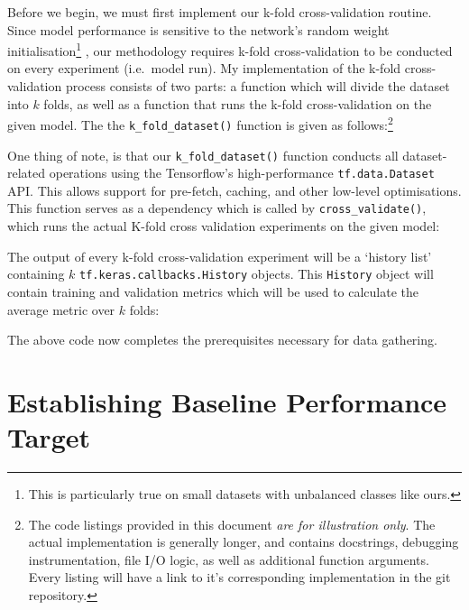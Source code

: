 Before we begin, we must first implement our k-fold cross-validation routine. Since model performance is sensitive to the network's random weight initialisation\footnote{This is particularly true on small datasets with unbalanced classes like ours.} \autocite{Narkhede2022}, our methodology requires k-fold cross-validation to be conducted on every experiment (i.e.\ model run). My implementation of the k-fold cross-validation process consists of two parts: a function which will divide the dataset into \(k\) folds, as well as a function that runs the k-fold cross-validation on the given model. The the \texttt{k_fold_dataset()} function is given as follows:\footnote{The code listings provided in this document \emph{are for illustration only}. The actual implementation is generally longer, and contains docstrings, debugging instrumentation, file I/O logic, as well as additional function arguments. Every listing will have a link to it's corresponding implementation in the git repository.}



\noindent
One thing of note, is that our \texttt{k_fold_dataset()} function conducts all dataset-related operations using the Tensorflow's high-performance \texttt{tf.data.Dataset} API. This allows support for pre-fetch, caching, and other low-level optimisations. This function serves as a dependency which is called by \texttt{cross_validate()}, which runs the actual K-fold cross validation experiments on the given model:



\noindent
The output of every k-fold cross-validation experiment will be a \enquote*{history list} containing \(k\) \texttt{tf.keras.callbacks.History} objects. This \texttt{History} object will contain training and validation metrics which will be used to calculate the average metric over \(k\) folds:



\noindent
The above code now completes the prerequisites necessary for data gathering.

\section{Establishing Baseline Performance Target}

